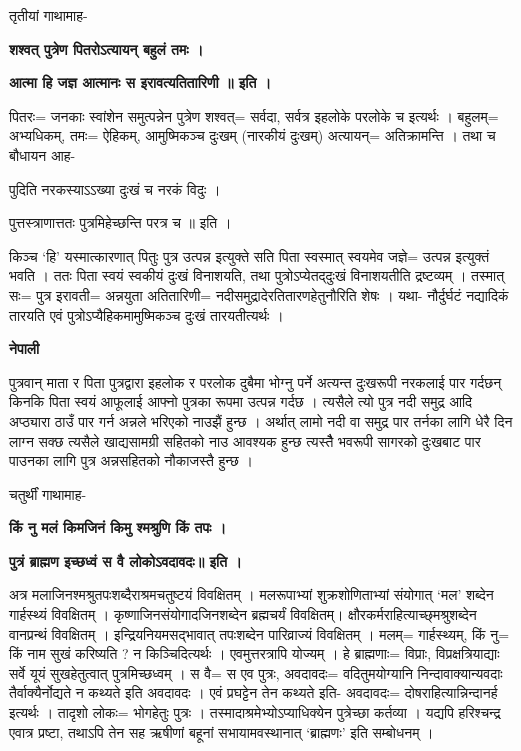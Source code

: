 \documentclass[11pt, a5paper]{article}
\begin{document}
तृतीयां गाथामाह-

\textbf{शश्वत् पुत्रेण पितरोऽत्यायन् बहुलं तमः ।}

\textbf{आत्मा हि जज्ञ आत्मानः स इरावत्यतितारिणी ॥ इति ।}

पितरः‍= जनकाः स्वांशेन समुत्पन्नेन पुत्रेण शश्वत्= सर्वदा, सर्वत्र इहलोके परलोके च इत्यर्थः । बहुलम्= अभ्यधिकम्, तमः= ऐहिकम्, आमुष्मिकञ्च दुःखम् (नारकीयं दुःखम्) अत्यायन्= अतिक्रामन्ति । तथा च बौधायन आह-

पुदिति नरकस्याऽऽख्या दुःखं च नरकं विदुः ।

पुत्तस्त्राणात्ततः पुत्रमिहेच्छन्ति परत्र च ॥ इति ।

किञ्च ‘हि’ यस्मात्कारणात् पितुः पुत्र उत्पन्न इत्युक्ते सति पिता स्वस्मात् स्वयमेव जज्ञे= उत्पन्न इत्युक्तं भवति । ततः पिता स्वयं स्वकीयं दुःखं विनाशयति, तथा पुत्रोऽप्येतद्‍दुःखं विनाशयतीति द्रष्टव्यम् । तस्मात् सः= पुत्र इरावती= अन्नयुता अतितारिणी= नदीसमुद्रादेरतितारणहेतुनौरिति शेषः । यथा- नौर्दुर्घटं नद्यादिकं तारयति एवं पुत्रोऽप्यैहिकमामुष्मिकञ्च दुःखं तारयतीत्यर्थः ।

\textbf{नेपाली}

पुत्रवान् माता र पिता पुत्रद्वारा इहलोक र परलोक दुबैमा भोग्नु पर्ने अत्यन्त दुःखरूपी नरकलाई पार गर्दछन् किनकि पिता स्वयं आफूलाई आफ्नो पुत्रका रूपमा उत्पन्न गर्दछ । त्यसैले त्यो पुत्र नदी समुद्र आदि अप्ठ्यारा ठाउँ पार गर्न अन्नले भरिएको नाउझैं हुन्छ । अर्थात् लामो नदी वा समुद्र पार तर्नका लागि धेरै दिन लाग्न सक्छ त्यसैले खाद्यसामग्री सहितको नाउ आवश्यक हुन्छ त्यस्तैै भवरूपी सागरको दुःखबाट पार पाउनका लागि पुत्र अन्नसहितको नौकाजस्तै हुन्छ ।

चतुर्थीं गाथामाह-

\textbf{किं नु मलं किमजिनं किमु श्मश्रुणि किं तपः ।}

\textbf{पुत्रं ब्राह्मण इच्छध्वं स वै लोकोऽवदावदः॥ इति ।}

अत्र मलाजिनश्मश्रुतपःशब्दैराश्रमचतुष्टयं विवक्षितम् । मलरूपाभ्यां शुक्रशोणिताभ्यां संयोगात् ‘मल’ शब्देन गार्हस्थ्यं विवक्षितम् । कृष्णाजिनसंयोगादजिनशब्देन ब्रह्मचर्यं विवक्षितम्। क्षौरकर्मराहित्याच्छ्‌मश्रुशब्देन वानप्रन्थं विवक्षितम् । इन्द्रियनियमसद्भावात् तपःशब्देन पारिव्राज्यं विवक्षितम् । मलम्= गार्हस्थ्यम्, किं नु= किं नाम सुखं करिष्यति ? न किञ्चिदित्यर्थः । एवमुत्तरत्रापि योज्यम् । हे ब्राह्मणाः= विप्राः, विप्रक्षत्रियाद्याः सर्वे यूयं सुखहेतुत्वात् पुत्रमिच्छध्वम् । स वै= स एव पुत्रः, अवदावदः= वदितुमयोग्यानि निन्दावाक्यान्यवदाः तैर्वाक्यैर्नोद्यते न कथ्यते इति अवदावदः । एवं प्रघट्टेन तेन कथ्यते इति- अवदावदः= दोषराहित्यान्निन्दानर्ह इत्यर्थः । तादृशो लोकः= भोगहेतुः पुत्रः । तस्मादाश्रमेभ्योऽप्याधिक्येन पुत्रेच्छा कर्तव्या । यद्यपि हरिश्चन्द्र एवात्र प्रष्टा, तथाऽपि तेन सह ऋषीणां बहूनां सभायामवस्थानात् ‘ब्राह्मणः’  इति सम्बोधनम् ।
\end{document}
